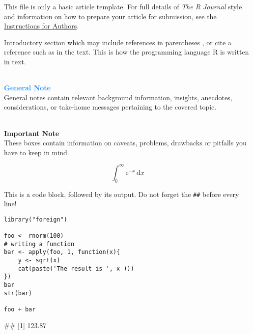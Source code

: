 This file is only a basic article template. For full details of \emph{The R Journal} style and information on how to prepare your article for submission, see the \href{https://journal.r-project.org/share/author-guide.pdf}{Instructions for Authors}.

Introductory section which may include references in parentheses
\citep{R}, or cite a reference such as \citet{R} in the text. This is how the programming language \textsf{R} is written in text.

\begin{box-info} \\
\textcolor{dodgerblue}{\textbf{General Note}} \\
General notes contain relevant background information, insights, anecdotes, considerations, or take-home messages pertaining to the covered topic.
\end{box-info}


\begin{box-important} \\
\textcolor{burgundyred}{\textbf{Important Note}} \\
These boxes contain information on caveats, problems, drawbacks or pitfalls you have to keep in mind.
\end{box-important}

$$ \int_0^\infty \mathrm{e}^{-x}\,\mathrm{d}x $$


This is a code block, followed by its output. Do not forget the \texttt{\#\#} before every line!

\begin{lstlisting}
library("foreign")

foo <- rnorm(100)
# writing a function
bar <- apply(foo, 1, function(x){
    y <- sqrt(x)
    cat(paste('The result is ', x )))
})
bar
str(bar)

foo + bar
\end{lstlisting}

\begin{example}
 ## [1] 123.87
\end{example}


\newpage

